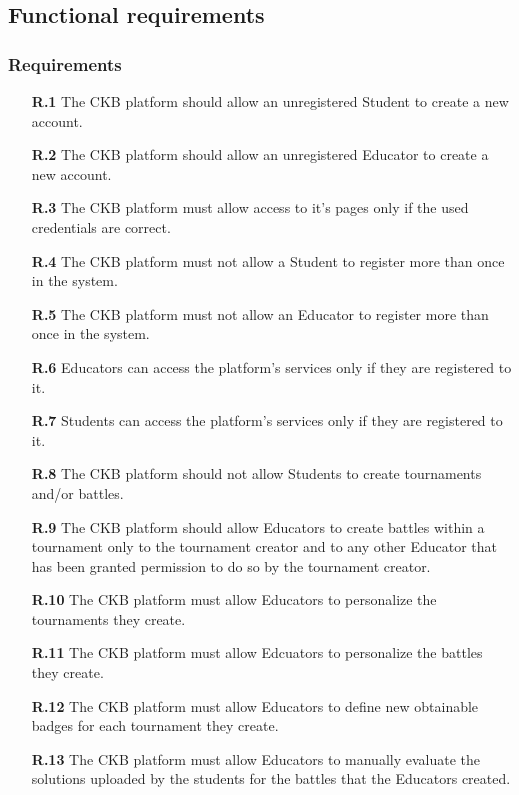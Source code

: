 \documentclass{article}
\begin{document}
{\subsection{Functional requirements}
\subsubsection{Requirements}
\begin{itemize}

    \item[\textbf{R.1}] The CKB platform should allow an unregistered Student to create a new account.
    \item[\textbf{R.2}] The CKB platform should allow an unregistered Educator to create a new account.
    \item[\textbf{R.3}] The CKB platform must allow access to it's pages only if the used credentials are correct.
    \item[\textbf{R.4}] The CKB platform must not allow a Student to register more than once in the system.
    \item[\textbf{R.5}] The CKB platform must not allow an Educator to register more than once in the system.
    \item[\textbf{R.6}] Educators can access the platform's services only if they are registered to it.
    \item[\textbf{R.7}] Students can access the platform's services only if they are registered to it.
    \item[\textbf{R.8}] The CKB platform should not allow Students to create tournaments and/or battles.
    \item[\textbf{R.9}] The CKB platform should allow Educators to create battles within a tournament only to the tournament
          creator and to any other Educator that has been granted permission to do so by the tournament creator.
    \item[\textbf{R.10}] The CKB platform must allow Educators to personalize the tournaments they create.
    \item[\textbf{R.11}] The CKB platform must allow Edcuators to personalize the battles they create.
    \item[\textbf{R.12}] The CKB platform must allow Educators to define new obtainable badges for each tournament they
          create.
    \item[\textbf{R.13}] The CKB platform must allow Educators to manually evaluate the solutions uploaded by the students for the battles that
          the Educators created.

\end{itemize}}
\end{document}
